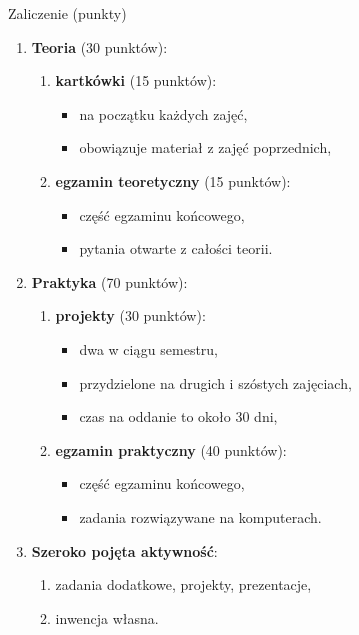 \documentclass[a4paper, 11pt]{beamer}
\begin{document}
	\begin{frame}{Zaliczenie (punkty)}
		\begin{enumerate}
			\item \textbf{Teoria} (30 punktów):
			\begin{enumerate}
				\item \textbf{kartkówki} (15 punktów):
				\begin{itemize}
					\item na początku każdych zajęć,
					\item obowiązuje materiał z zajęć poprzednich,
				\end{itemize}
				\item \textbf{egzamin teoretyczny} (15 punktów):
				\begin{itemize}
					\item część egzaminu końcowego,
					\item pytania otwarte z całości teorii.
				\end{itemize}
			\end{enumerate}
			\item \textbf{Praktyka} (70 punktów):
			\begin{enumerate}
				\item \textbf{projekty} (30 punktów):
				\begin{itemize}
					\item dwa w ciągu semestru,
					\item przydzielone na drugich i szóstych zajęciach,
					\item czas na oddanie to około 30 dni,
				\end{itemize}
				\item \textbf{egzamin praktyczny} (40 punktów):
				\begin{itemize}
					\item część egzaminu końcowego,
					\item zadania rozwiązywane na komputerach.
				\end{itemize}
			\end{enumerate}
			\item \textbf{Szeroko pojęta aktywność}:
			\begin{enumerate}
				\item zadania dodatkowe, projekty, prezentacje,
				\item inwencja własna.
			\end{enumerate}
		\end{enumerate}
	\end{frame}
	
\end{document}

